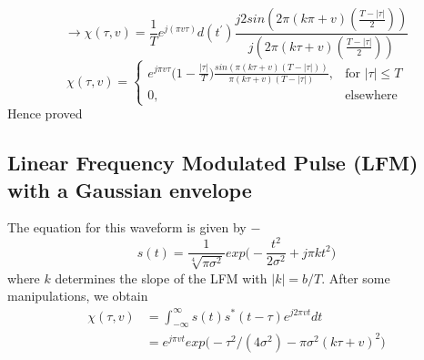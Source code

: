 \begin{equation*} 
\rightarrow \chi(\tau,v) =  \frac{1}{T} e^{j(\pi v\tau)} d(t^{'}) \frac{j2sin(2\pi(k\pi + v)(\frac{T-|\tau|}{2}))}{j(2\pi(k\tau + v)(\frac{T-|\tau|}{2}))}
\end{equation*}
\begin{equation*}
\chi(\tau,v) =  \begin{cases} e^{j\pi v \tau} \Big( 1 - \frac{|\tau|}{T} \Big) \frac{sin(\pi (k\tau + v)(T - |\tau|))}{\pi (k\tau + v)(T - |\tau|)}, & \mbox{for $|\tau| \leq T$} \\ 0, & \mbox{elsewhere} \end{cases} 
\end{equation*}
\noindent Hence proved

\subsection*{ Linear Frequency Modulated Pulse (LFM) with a Gaussian envelope } 
\noindent The equation for this waveform is given by $-$
\begin{equation}
 s(t) = \frac{1}{\sqrt[4]{\pi \sigma ^{2}}} exp \Bigg( - \frac{t^2}{2\sigma ^{2}} + j\pi k t^2 \Bigg)
 \end{equation}
 \noindent where $k$ determines the slope of the LFM with $|k| = b/T$. After some manipulations, we obtain
\begin{equation} \label{eq6}
\begin{split}
\chi(\tau,v) & = \int_{-\infty}^{\infty} s(t) s^{*}(t-\tau) e^{j2\pi vt}dt \\
& =  e^{j\pi vt} exp \Big( -\tau ^{2} / (4 \sigma ^{2}) - \pi \sigma ^{2} {(k\tau + v)}^{2} \Big) \\
\end{split}
\end{equation}

 
